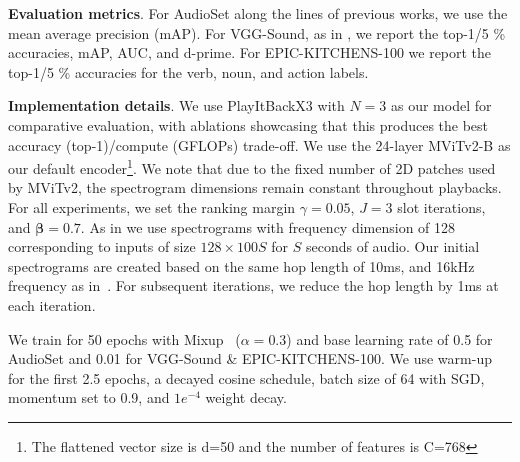 \documentclass{article}
\begin{document}
\noindent
\textbf{Evaluation metrics}. For AudioSet along the lines of previous works, we use the mean average precision (mAP). For VGG-Sound, as in \cite{kazakos2021slow}, we report the top-1/5 \% accuracies, mAP, AUC, and d-prime. For EPIC-KITCHENS-100 we report the top-1/5 \% accuracies for the verb, noun, and action labels.  

\noindent
\textbf{Implementation details}. We use PlayItBackX3 with $N\!\!=\!\!3$ as our model for comparative evaluation, with ablations showcasing that this produces the best accuracy (top-1)/compute (GFLOPs) trade-off. We use the 24-layer MViTv2-B \cite{li2022mvitv2} as our default encoder\footnote{The flattened vector size is d=50 and the number of features is C=768}. We note that due to the fixed number of 2D patches used by MViTv2, the spectrogram dimensions remain constant throughout playbacks. For all experiments, we set the ranking margin $\gamma\!\!=\!\!0.05$, $J=3$ slot iterations, and $\mathbf{\beta}\!=\!0.7$. As in \cite{kazakos2021slow} we use spectrograms with frequency dimension of 128 corresponding to inputs of size $128 \!\! \times \!\! 100S$ for $S$ seconds of audio. Our initial spectrograms are created based on the same hop length of 10ms, and 16kHz frequency as in~\cite{kazakos2021slow,nagrani2021attention,xu2022masked}.
For subsequent iterations, we reduce the hop length by 1ms at each iteration. 

We train for 50 epochs with  Mixup~\cite{zhang2018mixup} ($\alpha = 0.3$) and base learning rate of 0.5 for AudioSet and 0.01 for VGG-Sound \& EPIC-KITCHENS-100. We use warm-up for the first 2.5 epochs, a decayed cosine schedule, batch size of 64 with SGD, momentum set to 0.9, and $1e^{-4}$ weight decay.
\end{document}
